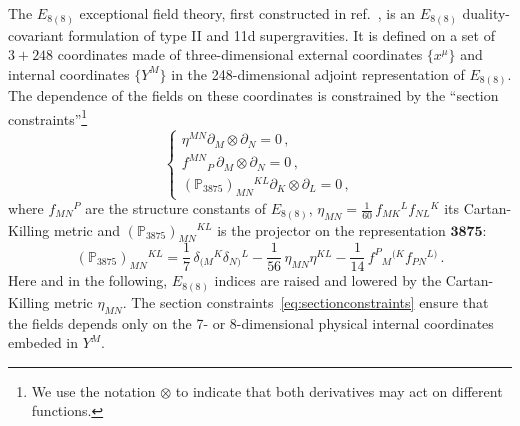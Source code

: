 \documentclass[a4paper, 11pt]{article}
\numberwithin{equation}{section}
\newcommand{\EE}{\ensuremath{E_{8(8)}}\xspace}
\newcommand{\+}{\oplus}
\begin{document}
The \EE exceptional field theory, first constructed in ref.~\cite{Hohm:2014fxa}, is an \EE duality-covariant formulation of type II and 11d supergravities. It is defined on a set of $3+248$ coordinates made of three-dimensional external coordinates $\{x^{\mu}\}$ and internal coordinates $\{Y^{M}\}$ in the 248-dimensional adjoint representation of \EE. The dependence of the fields on these coordinates is constrained by the ``section constraints''\footnote{We use the notation $\otimes$ to indicate that both derivatives may act on different functions.}
\begin{equation} \label{eq:sectionconstraints}
	\begin{cases}
		\eta^{MN}\partial_{M}\otimes\partial_{N} = 0\,,\\
		f^{MN}{}_{P}\,\partial_{M}\otimes\partial_{N} = 0\,,\\
		(\mathbb{P}_{3875})_{MN}{}^{KL}\partial_{K}\otimes\partial_{L} = 0\,,
	\end{cases}
\end{equation}
where $f_{MN}{}^{P}$ are the structure constants of \EE, $\eta_{MN} = \tfrac{1}{60}\,f_{MK}{}^{L}f_{NL}{}^{K}$ its Cartan-Killing metric and $(\mathbb{P}_{3875})_{MN}{}^{KL}$ is the projector on the representation $\mathbf{3875}$:
\begin{equation}
	(\mathbb{P}_{3875})_{MN}{}^{KL} = \frac{1}{7}\, \delta_{(M}{}^{K}\delta_{N)}{}^{L}-\frac{1}{56}\,\eta_{MN}\eta^{KL}-\frac{1}{14}\,f^{P}{}_{M}{}^{(K}f_{PN}{}^{L)}\,.
\end{equation}
Here and in the following, \EE indices are raised and lowered by the Cartan-Killing metric $\eta_{MN}$. The section constraints~\eqref{eq:sectionconstraints} ensure that the fields depends only on the 7- or 8-dimensional physical internal coordinates embeded in $Y^{M}$.
\end{document}
